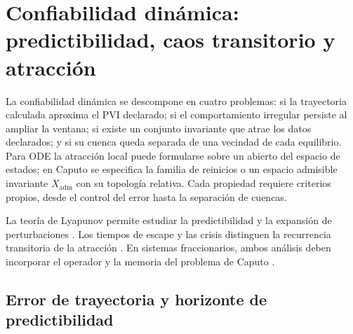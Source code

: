\section[Predictibilidad y caos transitorio]
{Confiabilidad dinámica: predictibilidad, caos transitorio y atracción}
\label{sec:confiabilidad-dinamica}

\HAFOCardReliability

La confiabilidad dinámica se descompone en cuatro problemas: si la trayectoria
calculada aproxima el PVI declarado; si el comportamiento irregular persiste al ampliar
la ventana; si existe un conjunto invariante que atrae los datos declarados; y
si su cuenca queda separada de una vecindad de cada equilibrio. Para ODE la
atracción local puede formularse sobre un abierto del espacio de estados; en
Caputo se especifica la familia de reinicios o un espacio admisible invariante
\(X_{\mathrm{adm}}\) con su topología relativa. Cada propiedad requiere criterios propios, desde el control del error hasta
la separación de cuencas.

La teoría de Lyapunov permite estudiar la predictibilidad y la expansión de
perturbaciones \cite{VallejoSanjuan2017Predictability,DatserisParlitz2022Nonlinear}.
Los tiempos de escape y las crisis distinguen la recurrencia transitoria de
la atracción \cite{Ott2002Chaos,TelGruiz2006Chaotic}. En sistemas
fraccionarios, ambos análisis deben incorporar el operador y la memoria del
problema de Caputo \cite{SunHeWang2022FractionalChaos,Sabatier2021InfiniteMemory}.

\subsection{Error de trayectoria y horizonte de predictibilidad}


